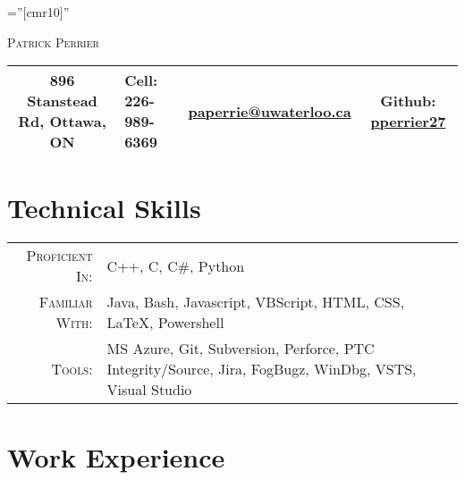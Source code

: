 \documentclass[a4paper,10pt]{article}
\newcommand\Tstrut{\rule{0pt}{2.9ex}}         %
\newcommand\Bstrut{\rule[-1.2ex]{0pt}{0pt}}   %
\newcommand\TBstrut{\Tstrut\Bstrut}           %
\begin{document}
\pagestyle{empty} %

\font\fb=''[cmr10]'' %

\par{\centering
		{\Huge \textsc{Patrick Perrier}
	}\bigskip\par}
\par{
	\begin{tabularx}{\textwidth}{c X X c}
		\hline
		896 Stanstead Rd, Ottawa, ON & Cell: 226-989-6369 
		& \href{mailto:paperrie@uwaterloo.ca}{paperrie@uwaterloo.ca}
		& Github: \href{https://github.com/pperrier27}{pperrier27} \TBstrut \\
		\hline
	\end{tabularx}
}
\section{Technical Skills}

\begin{tabular}{rl}
    \textsc{Proficient In:} & C++, C, C\#, Python \\
    \textsc{Familiar With:} & Java, Bash, Javascript, VBScript, HTML, CSS, \LaTeX, Powershell\\
   	\textsc{Tools:} & MS Azure, Git, Subversion, Perforce, PTC Integrity/Source, Jira, FogBugz, WinDbg, VSTS, Visual Studio
\end{tabular}

\section{Work Experience}


\end{document}
